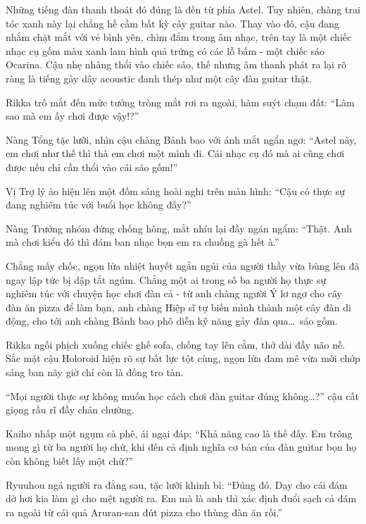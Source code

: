 \documentclass[../main.tex]{subfiles}
\begin{document}
Những tiếng đàn thanh thoát đó đúng là đến từ phía Astel. Tuy nhiên, chàng trai tóc xanh này lại chẳng hề cầm bất kỳ cây guitar nào. Thay vào đó, cậu đang nhắm chặt mắt với vẻ bình yên, chìm đắm trong âm nhạc, trên tay là một chiếc nhạc cụ gốm màu xanh lam hình quả trứng có các lỗ bấm - một chiếc sáo Ocarina. Cậu nhẹ nhàng thổi vào chiếc sáo, thế nhưng âm thanh phát ra lại rõ ràng là tiếng gảy dây acoustic đanh thép như một cây đàn guitar thật.



Rikka trố mắt đến mức tưởng tròng mắt rơi ra ngoài, hàm suýt chạm đất: ``Làm sao mà em ấy chơi được vậy!?''

Nàng Tổng tặc lưỡi, nhìn cậu chàng Bảnh bao với ánh mắt ngẩn ngơ: ``Astel này, em chơi như thế thì thà em chơi một mình đi. Cái nhạc cụ đó mà ai cũng chơi được nếu chỉ cần thổi vào cái sáo gốm!''

Vị Trợ lý ảo hiện lên một đốm sáng hoài nghi trên màn hình: ``Cậu có thực sự đang nghiêm túc với buổi học không đấy?''

Nàng Trưởng nhóm đứng chống hông, mắt nhíu lại đầy ngán ngẩm: ``Thật. Anh mà chơi kiểu đó thì đám ban nhạc bọn em ra chuồng gà hết à.''

\ct

Chẳng mấy chốc, ngọn lửa nhiệt huyết ngắn ngủi của người thầy vừa bùng lên đã ngay lập tức bị dập tắt ngúm. Chẳng một ai trong số ba người họ thực sự nghiêm túc với chuyện học chơi đàn cả - từ anh chàng người Ý lơ ngơ cho cây đàn ăn pizza để làm bạn, anh chàng Hiệp sĩ tự biến mình thành một cây đàn di động, cho tới anh chàng Bảnh bao phô diễn kỹ năng gảy đàn qua\dots\ sáo gốm.

Rikka ngồi phịch xuống chiếc ghế sofa, chống tay lên cằm, thở dài đầy não nề. Sắc mặt cậu Holoroid hiện rõ sự bất lực tột cùng, ngọn lửa đam mê vừa mới chớp sáng ban nãy giờ chỉ còn là đống tro tàn.


``Mọi người thực sự không muốn học cách chơi đàn guitar đúng không\dots?'' cậu cất giọng rầu rĩ đầy chán chường.

Kaiho nhấp một ngụm cà phê, ái ngại đáp: ``Khả năng cao là thế đấy. Em trông mong gì từ ba người họ chứ, khi đến cả định nghĩa cơ bản của đàn guitar bọn họ còn không biết lấy một chữ?''

Ryuuhou ngả người ra đằng sau, tặc lưỡi khinh bỉ: ``Đúng đó. Dạy cho cái đám dở hơi kia làm gì cho mệt người ra. Em mà là anh thì xác định đuổi sạch cả đám ra ngoài từ cái quả Aruran-san đút pizza cho thùng đàn ăn rồi.''
\end{document}

